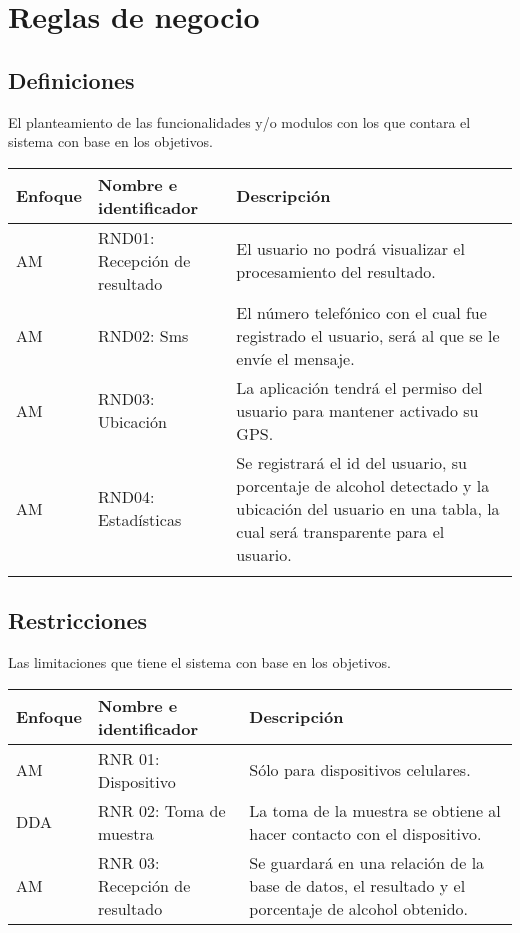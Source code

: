 \section{Reglas de negocio}
\subsection{Definiciones}
El planteamiento de las funcionalidades y/o modulos con los que contara el sistema con base en los objetivos.
  \begin{center}
   \begin{tabular}{|p{1.5cm}|p{4cm}|p{7cm}|}
     \hline
       \textbf{Enfoque}&\textbf{Nombre e identificador} & \textbf{Descripción} \\ \hline
           AM & RND01: Recepción de resultado &  El usuario no podrá visualizar el procesamiento del resultado. \\ \hline
           AM & RND02: Sms &  El número telefónico con el cual fue registrado el usuario, será al que se le envíe el mensaje. \\ \hline
           AM & RND03: Ubicación &  La aplicación tendrá el permiso del usuario para mantener activado su GPS. \\ \hline
           AM & RND04: Estadísticas &  Se registrará el id del usuario, su porcentaje de alcohol detectado y la ubicación del usuario en una tabla, la cual será transparente para el usuario. \\ \\ \hline
   \end{tabular}
    \label{tab:rnd}
 \end{center}

\subsection{Restricciones}
Las limitaciones que tiene el sistema con base en los objetivos.
  \begin{center}
   \begin{tabular}{|p{1.5cm}|p{4cm}|p{7cm}|}
     \hline
       \textbf{Enfoque}&\textbf{Nombre e identificador} & \textbf{Descripción} \\ \hline
           AM & RNR 01: Dispositivo &  Sólo para dispositivos celulares. \\ \hline
           DDA & RNR 02: Toma de muestra &  La toma de la muestra se obtiene al hacer contacto con el dispositivo. \\ \hline
           AM & RNR 03: Recepción de resultado &  Se guardará en una relación de la base de datos, el resultado y el porcentaje de alcohol
 obtenido. \\ \hline
   \end{tabular}
    \label{tab:rnr}
 \end{center}  

